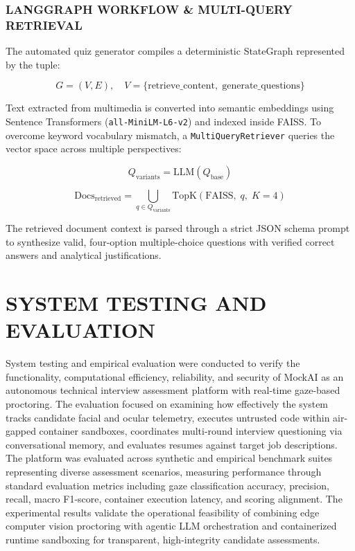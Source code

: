 \documentclass[12pt,a4paper]{report}
\begin{document}
\subsection{LANGGRAPH WORKFLOW \& MULTI-QUERY RETRIEVAL}

The automated quiz generator compiles a deterministic StateGraph represented by the
tuple:

\begin{equation}
  G = (V, E), \quad
  V = \{\text{retrieve\_content},\; \text{generate\_questions}\}
  \label{eq:langgraph}
\end{equation}

Text extracted from multimedia is converted into semantic embeddings using Sentence
Transformers (\texttt{all-MiniLM-L6-v2}) and indexed inside FAISS. To overcome keyword
vocabulary mismatch, a \texttt{MultiQueryRetriever} queries the vector space across
multiple perspectives:

\begin{equation}
  Q_{\text{variants}} = \text{LLM}(Q_{\text{base}})
  \label{eq:query-variants}
\end{equation}

\begin{equation}
  \text{Docs}_{\text{retrieved}} =
  \bigcup_{q \in Q_{\text{variants}}} \text{TopK}(\text{FAISS},\; q,\; K=4)
  \label{eq:multi-query}
\end{equation}

The retrieved document context is parsed through a strict JSON schema prompt to
synthesize valid, four-option multiple-choice questions with verified correct answers and
analytical justifications.

\chapter{SYSTEM TESTING AND EVALUATION}

System testing and empirical evaluation were conducted to verify the functionality,
computational efficiency, reliability, and security of MockAI as an autonomous technical
interview assessment platform with real-time gaze-based proctoring. The evaluation
focused on examining how effectively the system tracks candidate facial and ocular
telemetry, executes untrusted code within air-gapped container sandboxes, coordinates
multi-round interview questioning via conversational memory, and evaluates resumes against
target job descriptions. The platform was evaluated across synthetic and empirical
benchmark suites representing diverse assessment scenarios, measuring performance through
standard evaluation metrics including gaze classification accuracy, precision, recall, macro
F1-score, container execution latency, and scoring alignment. The experimental results
validate the operational feasibility of combining edge computer vision proctoring with
agentic LLM orchestration and containerized runtime sandboxing for transparent,
high-integrity candidate assessments.
\end{document}

